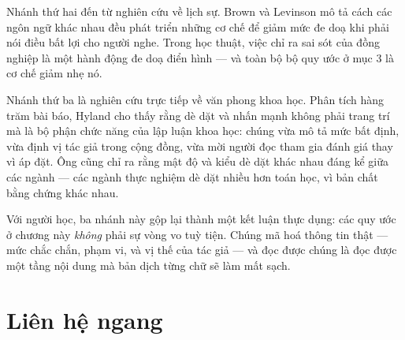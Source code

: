 \documentclass[../../english.tex]{subfiles}
\begin{document}
Nhánh thứ hai đến từ nghiên cứu về lịch sự. Brown và Levinson mô tả cách các ngôn ngữ khác nhau đều phát triển những cơ chế để giảm mức đe doạ khi phải nói điều bất lợi cho người nghe\cite{brownlevinson1987}. Trong học thuật, việc chỉ ra sai sót của đồng nghiệp là một hành động đe doạ điển hình --- và toàn bộ bộ quy ước ở mục 3 là cơ chế giảm nhẹ nó.

Nhánh thứ ba là nghiên cứu trực tiếp về văn phong khoa học. Phân tích hàng trăm bài báo, Hyland cho thấy rằng dè dặt và nhấn mạnh không phải trang trí mà là bộ phận chức năng của lập luận khoa học\cite{hyland1998,hyland2005}: chúng vừa mô tả mức bất định, vừa định vị tác giả trong cộng đồng, vừa mời người đọc tham gia đánh giá thay vì áp đặt. Ông cũng chỉ ra rằng mật độ và kiểu dè dặt khác nhau đáng kể giữa các ngành --- các ngành thực nghiệm dè dặt nhiều hơn toán học, vì bản chất bằng chứng khác nhau.

Với người học, ba nhánh này gộp lại thành một kết luận thực dụng: các quy ước ở chương này \emph{không} phải sự vòng vo tuỳ tiện. Chúng mã hoá thông tin thật --- mức chắc chắn, phạm vi, và vị thế của tác giả --- và đọc được chúng là đọc được một tầng nội dung mà bản dịch từng chữ sẽ làm mất sạch.

\begin{gocre}
\end{gocre}

\section{Liên hệ ngang}
\end{document}

